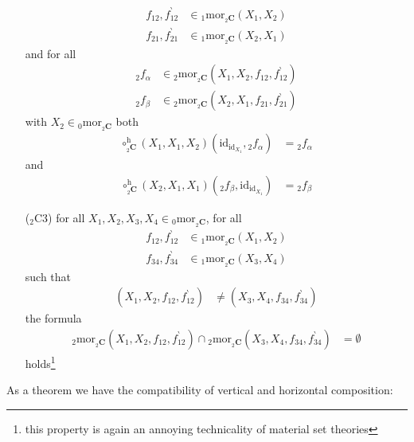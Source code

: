 \begin{enumerate}
\begin{align*}
  f_{12},f_{12}^{\backprime}
  &\in
  {}_{1}\mathrm{mor}_{{}_{2}\mathbf{C}}(X_{1},X_{2})
  \\
  f_{21},f_{21}^{\backprime}
  &\in
  {}_{1}\mathrm{mor}_{{}_{2}\mathbf{C}}(X_{2},X_{1})
\end{align*}
and for all
\begin{align*}
  {}_{2}f_{\alpha}
  &\in
  {}_{2}\mathrm{mor}_{{}_{2}\mathbf{C}}(X_{1},X_{2},f_{12},f_{12}^{\backprime})
  \\
  {}_{2}f_{\beta}
  &\in
  {}_{2}\mathrm{mor}_{{}_{2}\mathbf{C}}(X_{2},X_{1},f_{21},f_{21}^{\backprime})
\end{align*}
with $X_{2} \in {}_{0}\mathrm{mor}_{{}_{2}\mathbf{C}}$ both
\begin{align*}
  \circ_{{}_{2}\mathbf{C}}^{\textrm{h}}
  (X_{1},X_{1},X_{2})
  (\mathrm{id}_{\mathrm{id}_{X_{1}}},{}_{2}f_{\alpha})
  &=
  {}_{2}f_{\alpha}
\end{align*}
and
\begin{align*}
  \circ_{{}_{2}\mathbf{C}}^{\textrm{h}}
  (X_{2},X_{1},X_{1})
  ({}_{2}f_{\beta},\mathrm{id}_{\mathrm{id}_{X_{1}}})
  &=
  {}_{2}f_{\beta}
\end{align*}
\item[(${}_{2}$C3)]
for all $X_{1},X_{2},X_{3},X_{4} \in {}_{0}\mathrm{mor}_{{}_{2}\mathbf{C}}$, for all
\begin{align*}
  f_{12},f_{12}^{\backprime}
  &\in
  {}_{1}\mathrm{mor}_{{}_{2}\mathbf{C}}(X_{1},X_{2})
  \\
  f_{34},f_{34}^{\backprime}
  &\in
  {}_{1}\mathrm{mor}_{{}_{2}\mathbf{C}}(X_{3},X_{4})
\end{align*}
such that
\begin{align*}
  (X_{1},X_{2},f_{12},f_{12}^{\backprime})
  &\neq
  (X_{3},X_{4},f_{34},f_{34}^{\backprime})
\end{align*}
the formula
\begin{align*}
  {}_{2}\mathrm{mor}_{{}_{2}\mathbf{C}}(X_{1},X_{2},f_{12},f_{12}^{\backprime})
  \cap
  {}_{2}\mathrm{mor}_{{}_{2}\mathbf{C}}(X_{3},X_{4},f_{34},f_{34}^{\backprime})
  &=
  \emptyset
\end{align*}
holds\footnote{this property is again an annoying technicality of material set theories}
\end{enumerate}
As a theorem we have the compatibility of vertical and horizontal composition:
\\
